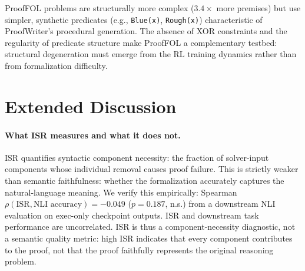 \begin{table}[!ht]
\centering
\caption{ProofFOL vs.\ FOLIO structural comparison (training sets, $n{=}500$ each).}
\label{tab:prooffol-vs-folio}
\small
{}
\end{table}

ProofFOL problems are structurally more complex ($3.4{\times}$ more premises) but use simpler, synthetic predicates (e.g., \texttt{Blue(x)}, \texttt{Rough(x)}) characteristic of ProofWriter's procedural generation.
The absence of XOR constraints and the regularity of predicate structure make ProofFOL a complementary testbed: structural degeneration must emerge from the RL training dynamics rather than from formalization difficulty.

\section{Extended Discussion}
\label{app:extended-discussion}

\paragraph{What ISR measures and what it does not.}
ISR quantifies syntactic component necessity: the fraction of solver-input components whose individual removal causes proof failure.
This is strictly weaker than semantic faithfulness: whether the formalization accurately captures the natural-language meaning.
We verify this empirically: Spearman $\rho(\text{ISR}, \text{NLI accuracy}) = -0.049$ ($p = 0.187$, n.s.) from a downstream NLI evaluation on exec-only checkpoint outputs.
ISR and downstream task performance are uncorrelated.
ISR is thus a component-necessity diagnostic, not a semantic quality metric: high ISR indicates that every component contributes to the proof, not that the proof faithfully represents the original reasoning problem.

